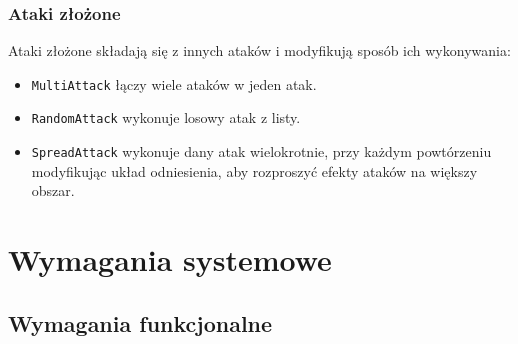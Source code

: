 \documentclass{article}
\begin{document}
			\subsubsection{Ataki złożone}
				Ataki złożone składają się z innych ataków i modyfikują sposób ich wykonywania:
				\begin{itemize}
					\item \verb|MultiAttack| łączy wiele ataków w jeden atak.
					\item \verb|RandomAttack| wykonuje losowy atak z listy.
					\item \verb|SpreadAttack| wykonuje dany atak wielokrotnie, przy każdym powtórzeniu modyfikując układ odniesienia, aby rozproszyć efekty ataków na większy obszar.
				\end{itemize}

	
	\section{Wymagania systemowe}
	
		\subsection{Wymagania funkcjonalne}
		
\end{document}
